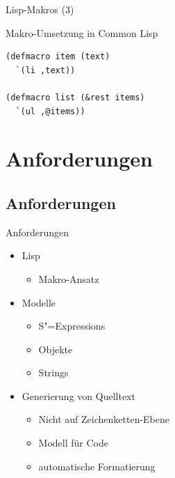 \documentclass{beamer}
\newcommand{\sexps}{S"=Expressions}
\begin{document}
\begin{frame}[fragile]{Lisp-Makros (3)}
  \begin{block}{Makro-Umsetzung in Common Lisp}
\begin{verbatim}
(defmacro item (text)
  `(li ,text))

(defmacro list (&rest items)
  `(ul ,@items))
\end{verbatim}
  \end{block}
\end{frame}

\section{Anforderungen}
\subsection{Anforderungen}

\begin{frame}{Anforderungen}
  \begin{itemize}
  \item Lisp
    \begin{itemize}
    \item Makro-Ansatz
    \end{itemize}
  \item Modelle
    \begin{itemize}
    \item \sexps{}
    \item Objekte
    \item Strings
    \end{itemize}
  \item Generierung von Quelltext
    \begin{itemize}
    \item Nicht auf Zeichenketten-Ebene
    \item Modell für Code
    \item automatische Formatierung
    \end{itemize}
  \end{itemize}
\end{frame}
\end{document}

